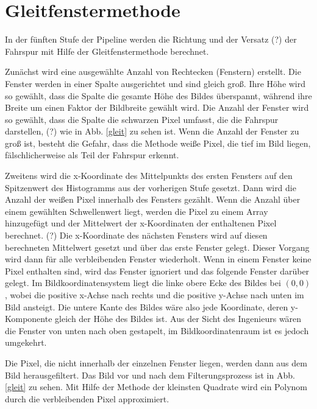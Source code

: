 \documentclass[arbeit=studie,oneside,BCOR=12mm]{ArbeitRST}
\begin{document}
\section{Gleitfenstermethode}

In der fünften Stufe der Pipeline werden die Richtung und der Versatz (?) der
Fahrspur mit Hilfe der Gleitfenstermethode berechnet.

Zunächst wird eine ausgewählte Anzahl von Rechtecken (Fenstern) erstellt. Die
Fenster werden in einer Spalte ausgerichtet und sind gleich groß. Ihre Höhe
wird so gewählt, dass die Spalte die gesamte Höhe des Bildes überspannt,
während ihre Breite um einen Faktor der Bildbreite gewählt wird. Die Anzahl der
Fenster wird so gewählt, dass die Spalte die schwarzen Pixel umfasst, die die
Fahrspur darstellen, (?) wie in Abb. \ref{gleit} zu sehen ist. Wenn die Anzahl der
Fenster zu groß ist, besteht die Gefahr, dass die Methode weiße Pixel, die tief
im Bild liegen, fälschlicherweise als Teil der Fahrspur erkennt. 

Zweitens wird die x-Koordinate des Mittelpunkts des ersten Fensters auf den
Spitzenwert des Histogramms aus der vorherigen Stufe gesetzt. Dann wird die
Anzahl der weißen Pixel innerhalb des Fensters gezählt. Wenn die Anzahl über
einem gewählten Schwellenwert liegt, werden die Pixel zu einem Array
hinzugefügt und der Mittelwert der x-Koordinaten der enthaltenen Pixel
berechnet. (?) Die x-Koordinate des nächsten Fensters wird auf diesen
berechneten Mittelwert gesetzt und über das erste Fenster gelegt. Dieser
Vorgang wird dann für alle verbleibenden Fenster wiederholt. Wenn in einem
Fenster keine Pixel enthalten sind, wird das Fenster ignoriert und das folgende
Fenster darüber gelegt. Im Bildkoordinatensystem liegt die linke obere Ecke des
Bildes bei $(0, 0)$, wobei die positive x-Achse nach rechts und die positive
y-Achse nach unten im Bild ansteigt. Die untere Kante des Bildes wäre also jede
Koordinate, deren y-Komponente gleich der Höhe des Bildes ist. Aus der Sicht
des Ingenieurs wären die Fenster von unten nach oben gestapelt, im
Bildkoordinatenraum ist es jedoch umgekehrt. 

Die Pixel, die nicht innerhalb der einzelnen Fenster liegen, werden dann aus
dem Bild herausgefiltert. Das Bild vor und nach dem Filterungsprozess ist in
Abb. \ref{gleit} zu sehen. Mit Hilfe der Methode der kleinsten Quadrate wird ein
Polynom durch die verbleibenden Pixel approximiert.
\end{document}
